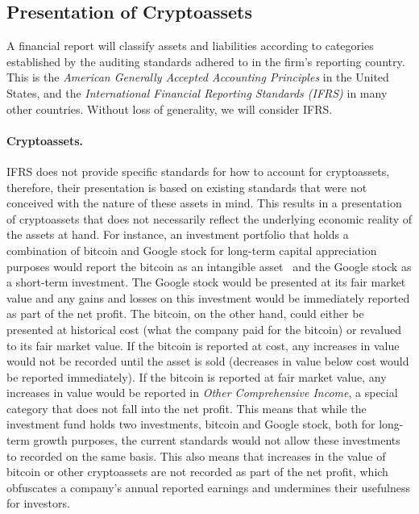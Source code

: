 \subsection{Presentation of Cryptoassets}
A financial report will classify assets and liabilities according to categories established by the auditing standards adhered to in the firm{'}s reporting country. This is the \textit{American Generally Accepted Accounting Principles} in the United States, and the \textit{International Financial Reporting Standards (IFRS)} in many other countries. Without loss of generality, we will consider IFRS.

\paragraph{Cryptoassets.} IFRS does not provide specific standards for how to account for cryptoassets, therefore, their presentation is based on existing standards that were not conceived with the nature of these assets in mind. This results in a presentation of cryptoassets that does not necessarily reflect the underlying economic reality of the assets at hand. For instance, an investment portfolio that holds a combination of bitcoin and Google stock for long-term capital appreciation purposes would report the bitcoin as an intangible asset~\cite{RCGTIFRsCrypto2018} and the Google stock as a short-term investment. The Google stock would be presented at its fair market value and any gains and losses on this investment would be immediately reported as part of the net profit. The bitcoin, on the other hand, could either be presented at historical cost (what the company paid for the bitcoin) or revalued to its fair market value. If the bitcoin is reported at cost, any increases in value would not be recorded until the asset is sold (decreases in value below cost would be reported immediately). If the bitcoin is reported at fair market value, any increases in value would be reported in \textit{Other Comprehensive Income}, a special category that does not fall into the net profit. This means that while the investment fund holds two investments, bitcoin and Google stock, both for long-term growth purposes, the current standards would not allow these investments to recorded on the same basis. This also means that increases in the value of bitcoin or other cryptoassets are not recorded as part of the net profit, which obfuscates a company{'}s annual reported earnings and undermines their usefulness for investors. 

